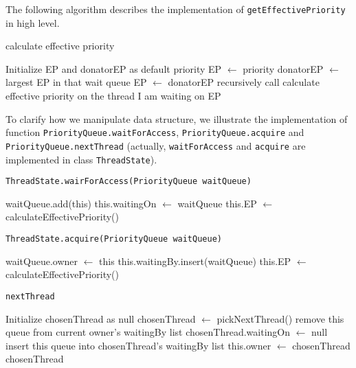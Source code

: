 \documentclass{article}
\begin{document}
\begin{spacing}{1.1}
The following algorithm describes the implementation of \texttt{getEffectivePriority} in high level.

\begin{algorithm}
  \caption{calculate effective priority}
\begin{algorithmic}[1]
  \STATE Initialize EP and donatorEP as default priority
  \STATE EP $\leftarrow$ priority
  \STATE donatorEP $\leftarrow$ largest EP in that wait queue
    \STATE EP $\leftarrow$ donatorEP
  \ENDIF
\ENDFOR
\STATE recursively call calculate effective priority on the thread I am waiting on
\RETURN EP
\end{algorithmic}
\end{algorithm}

To clarify how we manipulate data structure, we illustrate the implementation of function \linebreak \texttt{PriorityQueue.waitForAccess}, \texttt{PriorityQueue.acquire} and \texttt{PriorityQueue.nextThread} (actually, \linebreak \texttt{waitForAccess} and \texttt{acquire} are implemented in class \texttt{ThreadState}).

\begin{algorithm}
  \caption{\texttt{ThreadState.wairForAccess(PriorityQueue waitQueue)}}
\begin{algorithmic}[1]
  \STATE waitQueue.add(this)  
  \STATE this.waitingOn $\leftarrow$ waitQueue  
  \STATE this.EP $\leftarrow$ calculateEffectivePriority()  
\RETURN
\end{algorithmic}
\end{algorithm}

\begin{algorithm}
  \caption{\texttt{ThreadState.acquire(PriorityQueue waitQueue)}}
\begin{algorithmic}[1]
  \STATE waitQueue.owner $\leftarrow$ this
  \STATE this.waitingBy.insert(waitQueue)
  \STATE this.EP $\leftarrow$ calculateEffectivePriority()  
\RETURN
\end{algorithmic}
\end{algorithm}

\begin{algorithm}
  \caption{\texttt{nextThread}}
\begin{algorithmic}[1]
  \STATE Initialize chosenThread as null
  \STATE chosenThread $\leftarrow$ pickNextThread()
    \STATE remove this queue from current owner's waitingBy list
    \STATE chosenThread.waitingOn $\leftarrow$ null
    \STATE insert this queue into chosenThread's waitingBy list
  \ENDIF
  \STATE this.owner $\leftarrow$ chosenThread
\RETURN chosenThread
\end{algorithmic}
\end{algorithm}


\end{spacing}
\end{document}
